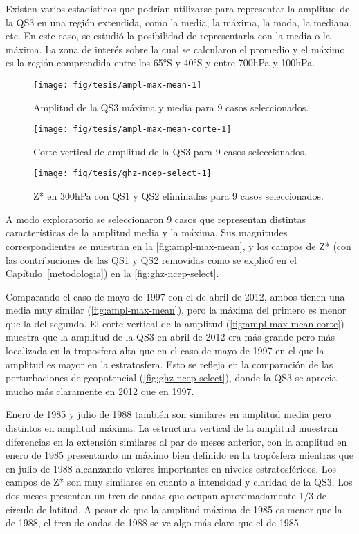 \documentclass[spanish,a4paper,12p]{book}
\begin{document}
Existen varios estadísticos que podrían utilizarse para representar la
amplitud de la QS3 en una región extendida, como la media, la máxima, la
moda, la mediana, etc. En este caso, se estudió la posibilidad de
representarla con la media o la máxima. La zona de interés sobre la cual
se calcularon el promedio y el máximo es la región comprendida entre los
65°S y 40°S y entre 700hPa y 100hPa.

\begin{figure*}
\texttt{[image: fig/tesis/ampl-max-mean-1]} \caption{Amplitud de la QS3 máxima y media para 9 casos seleccionados.}\label{fig:ampl-max-mean}
\end{figure*}

\begin{figure*}
\texttt{[image: fig/tesis/ampl-max-mean-corte-1]} \caption{Corte vertical de amplitud de la QS3 para 9 casos seleccionados.}\label{fig:ampl-max-mean-corte}
\end{figure*}

\begin{figure*}
\texttt{[image: fig/tesis/ghz-ncep-select-1]} \caption{Z* en 300hPa con QS1 y QS2 eliminadas para 9 casos seleccionados.}\label{fig:ghz-ncep-select}
\end{figure*}

A modo exploratorio se seleccionaron 9 casos que representan distintas
características de la amplitud media y la máxima. Sus magnitudes
correspondientes se muestran en la \autoref{fig:ampl-max-mean}, y los
campos de Z* (con las contribuciones de las QS1 y QS2 removidas como se
explicó en el Capítulo~\ref{metodologia}) en la
\autoref{fig:ghz-ncep-select}.

Comparando el caso de mayo de 1997 con el de abril de 2012, ambos tienen
una media muy similar (\autoref{fig:ampl-max-mean}), pero la máxima del
primero es menor que la del segundo. El corte vertical de la amplitud
(\autoref{fig:ampl-max-mean-corte}) muestra que la amplitud de la QS3 en
abril de 2012 era más grande pero más localizada en la troposfera alta
que en el caso de mayo de 1997 en el que la amplitud es mayor en la
estratosfera. Esto se refleja en la comparación de las perturbaciones de
geopotencial (\autoref{fig:ghz-ncep-select}), donde la QS3 se aprecia
mucho más claramente en 2012 que en 1997.

Enero de 1985 y julio de 1988 también son similares en amplitud media
pero distintos en amplitud máxima. La estructura vertical de la amplitud
muestran diferencias en la extensión similares al par de meses anterior,
con la amplitud en enero de 1985 presentando un máximo bien definido en
la tropósfera mientras que en julio de 1988 alcanzando valores
importantes en niveles estratosféricos. Los campos de Z* son muy
similares en cuanto a intensidad y claridad de la QS3. Los dos meses
presentan un tren de ondas que ocupan aproximadamente 1/3 de círculo de
latitud. A pesar de que la amplitud máxima de 1985 es menor que la de
1988, el tren de ondas de 1988 se ve algo más claro que el de 1985.
\end{document}
